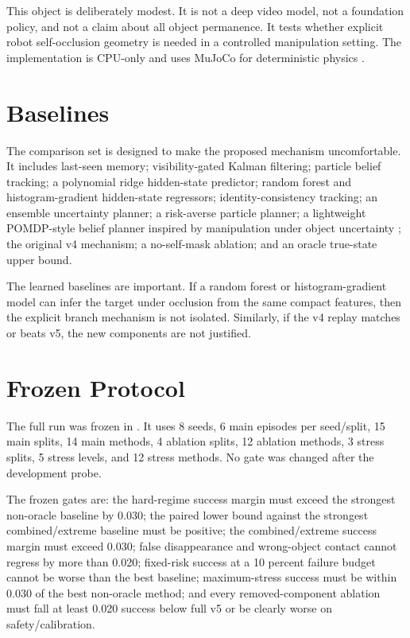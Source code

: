 \documentclass{article}
\begin{document}
This object is deliberately modest.
It is not a deep video model, not a foundation policy, and not a claim about all object permanence.
It tests whether explicit robot self-occlusion geometry is needed in a controlled manipulation setting.
The implementation is CPU-only and uses MuJoCo for deterministic physics \citep{todorov2012mujoco}.

\section{Baselines}
The comparison set is designed to make the proposed mechanism uncomfortable.
It includes last-seen memory; visibility-gated Kalman filtering; particle belief tracking; a polynomial ridge hidden-state predictor; random forest and histogram-gradient hidden-state regressors; identity-consistency tracking; an ensemble uncertainty planner; a risk-averse particle planner; a lightweight POMDP-style belief planner inspired by manipulation under object uncertainty \citep{pajarinen2023pomdp}; the original v4 mechanism; a no-self-mask ablation; and an oracle true-state upper bound.

The learned baselines are important.
If a random forest or histogram-gradient model can infer the target under occlusion from the same compact features, then the explicit branch mechanism is not isolated.
Similarly, if the v4 replay matches or beats v5, the new components are not justified.

\section{Frozen Protocol}
The full run was frozen in .
It uses 8 seeds, 6 main episodes per seed/split, 15 main splits, 14 main methods, 4 ablation splits, 12 ablation methods, 3 stress splits, 5 stress levels, and 12 stress methods.
No gate was changed after the development probe.

The frozen gates are:
the hard-regime success margin must exceed the strongest non-oracle baseline by 0.030;
the paired lower bound against the strongest combined/extreme baseline must be positive;
the combined/extreme success margin must exceed 0.030;
false disappearance and wrong-object contact cannot regress by more than 0.020;
fixed-risk success at a 10 percent failure budget cannot be worse than the best baseline;
maximum-stress success must be within 0.030 of the best non-oracle method;
and every removed-component ablation must fall at least 0.020 success below full v5 or be clearly worse on safety/calibration.
\end{document}
